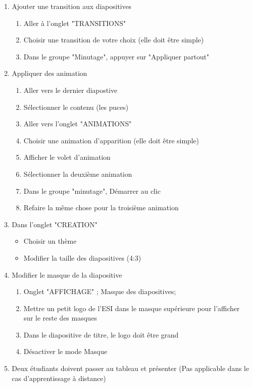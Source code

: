 \documentclass[11pt, a4paper]{article}
\begin{document}
\begin{enumerate}
	\item Ajouter une transition aux diapositives
	\begin{multicols}{3}
	\begin{enumerate}
		\item Aller à l'onglet "TRANSITIONS"
		\item Choisir une transition de votre choix (elle doit être simple)
		\item Dans le groupe "Minutage", appuyer sur "Appliquer partout" 
	\end{enumerate}
	\end{multicols}
	
	\newpage
	\item Appliquer des animation
	\begin{multicols}{3}
	\begin{enumerate}
		\item Aller vers le dernier diapostive
		\item Sélectionner le contenu (les puces)
		\item Aller vers l'onglet "ANIMATIONS"
		\item Choisir une animation d'apparition (elle doit être simple)
		\item Afficher le volet d'animation
		\item Sélectionner la deuxième animation
		\item Dans le groupe "minutage", Démarrer au clic
		\item Refaire la même chose pour la troisième animation
	\end{enumerate}
	\end{multicols}
	
	\item Dans l'onglet "CREATION"
	\begin{multicols}{2}
	\begin{itemize}
		\item Choisir un thème
		\item Modifier la taille des diapositives (4:3)
	\end{itemize}
	\end{multicols}
	
	\item Modifier le masque de la diapositive 
	\begin{enumerate}
		\item Onglet "AFFICHAGE" ; Masque des diapositives;
		\item Mettre un petit logo de l'ESI dans le masque supérieure pour l'afficher sur le reste des masques
		\item Dans le diapositive de titre, le logo doit être grand
		\item Désactiver le mode Masque 
	\end{enumerate}
	
	\item Deux étudiants doivent passer au tableau et présenter (Pas applicable dans le cas d'apprentissage à distance)
\end{enumerate}
\end{document}
